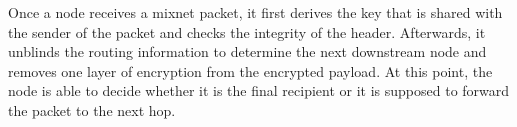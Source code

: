 Once a node receives a mixnet packet, it first derives the key that is shared with the sender of the packet and checks the integrity of the header. Afterwards, it unblinds the routing information to determine the next downstream node and removes one layer of encryption from the encrypted payload. At this point, the node is able to decide whether it is the final recipient or it is supposed to forward the packet to the next hop.

\begin{comment}
\paragraph{Notation:}Let $\kappa=128$ be the security parameter. With non-negligible probability, an adversary must perform around $2^\kappa$ operations to break the security of Sphinx.

Let $r$ be the maximum number of nodes that a Sphinx mix message will traverse before being delivered to its destination.

$G$ is a prime order cyclic group satisfying the decisional Diffie-Hellman assumption \cite{Boneh_1998}. We use the secp256k1 elliptic curve \cite{secp}. The element $g$ is a generator of $G$ and $q$ is the (prime) order of $G$, with $q\approx2^{2*\kappa}$.

$G^*$ is the set of non-identity elements of G. $h_b$ is a pre-image resistant hash function used to compute blinding factors and modelled as a random oracle such that
$h_b:G^*\times G^*\rightarrow\mathbb{Z}^*_q$, where $\mathbb{Z}^*_q$ is the field of non-identity elements of $\mathbb{Z}_q$ (field of integers). We use the BLAKE2s hash function \cite{blake2}.

Each node $i$ has a private key $x_{i}\in \mathbb{Z}^*_q$ and a public key $y_{i}=g^{x_{i}}\in G^*$.
$\alpha_i$ is the group elements which, when combined with the nodes’ public keys, allow a shared key to be computed for each via Diffie-Hellman (DH) key exchange. This ensures that each node in the user-chosen route can forward the packet to the next, and only the receiving mix node can decrypt it.
$s_i$ are the DH shared secrets, $b_i$ are the blinding factors.
\end{comment}









